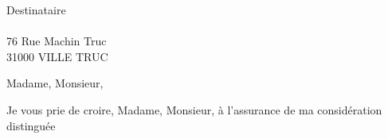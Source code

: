 \documentclass[11pt]{lettre}
\makeatletter
\newcommand*{\NoRule}{\renewcommand*{\rule@length}{0}}
\makeatother
\begin{document}
%
\begin{letter}{Destinataire\\~\\
76 Rue Machin Truc\\
31000 VILLE TRUC\\
}
\date{\today{}} 
\NoRule
\vspace{-100px}
%

\opening{Madame, Monsieur,}
\lipsum[1]

\closing{Je vous prie de croire, Madame, Monsieur, à l'assurance de ma considération distinguée}
\end{letter}
\end{document}
